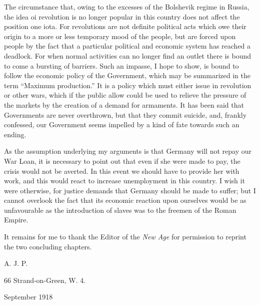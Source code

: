 \documentclass{book}
\begin{document}
The circumstance that, owing to the excesses of the Bolshevik regime in Russia, the idea oi revolution is no longer popular in this country does not affect the position one iota. For revolutions are not definite political acts which owe their origin to a more or less temporary mood of the people, but are forced upon people by the fact that a particular political and economic system has reached a deadlock. For when normal activities can no longer find an outlet there is bound to come a bursting of barriers. Such an impasse, I hope to show, is bound to follow the economic policy of the Government, which may be summarized in the term “Maximum production.” It is a policy which must either issue in revolution or other wars, which if the public allow could be used to relieve the pressure of the markets by the creation of a demand for armaments. It has been said that Governments are never overthrown, but that they commit suicide, and, frankly confessed, our Government seems impelled by a kind of fate towards such an ending.

As the assumption underlying my arguments is that Germany will not repay our War Loan, it is necessary to point out that even if she were made to pay, the crisis would not be averted. In this event we should have to provide her with work, and this would react to increase unemployment in this country. I wish it were otherwise, for justice demands that Germany should be made to suffer; but I cannot overlook the fact that its economic reaction upon ourselves would be as unfavourable as the introduction of slaves was to the freemen of the Roman Empire.

It remains for me to thank the Editor of the \emph{New Age} for permission to reprint the two concluding chapters.

A. J. P.

66 Strand-on-Green, W. 4.

September 1918
\end{document}
